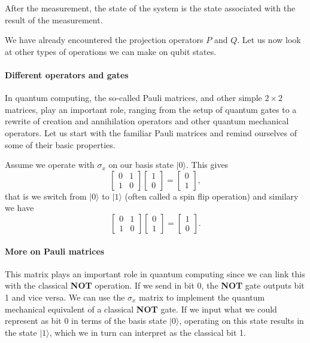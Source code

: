After the measurement, the state of the system is the state associated with the result of the measurement.

We have already encountered the projection operators $P$ and $Q$. Let
us now look at other types of operations we can make on qubit states.


\paragraph{Different operators and gates}

In quantum computing, the so-called Pauli matrices, and other simple
$2\times 2$ matrices, play an important role, ranging from the setup
of quantum gates to a rewrite of creation and annihilation operators
and other quantum mechanical operators. Let us start with the familiar
Pauli matrices and remind ourselves of some of their basic properties.

Assume we operate with $\sigma_x$ on our basis state $\vert 0 \rangle$. This gives
\[
\begin{bmatrix} 0 & 1 \\ 1 & 0 \end{bmatrix}\begin{bmatrix} 1 \\ 0 \end{bmatrix}=\begin{bmatrix} 0  \\ 1  \end{bmatrix},
\]
that is we switch from $\vert 0\rangle$ to $\vert 1\rangle$ (often called a spin flip operation) and similary we have
\[
\begin{bmatrix} 0 & 1 \\ 1 & 0 \end{bmatrix}\begin{bmatrix} 0 \\ 1 \end{bmatrix}=\begin{bmatrix} 1  \\ 0  \end{bmatrix}.
\]


\paragraph{More on Pauli matrices}

This matrix plays an important role in quantum computing since we can
link this with the classical \textbf{NOT} operation.  If we send in bit 0,
the \textbf{NOT} gate outputs bit 1 and vice versa. We can use the $\sigma_x$
matrix to implement the quantum mechanical equivalent of a classical
\textbf{NOT} gate. If we input what we could represent as bit 0 in terms of
the basis state $\vert 0\rangle$, operating on this state results in
the state $\vert 1\rangle$, which we in turn can interpret as the
classical bit 1.


